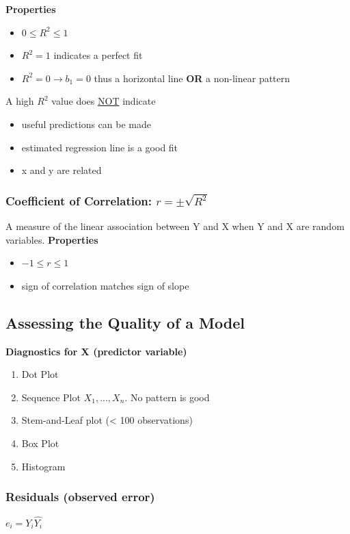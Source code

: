 \documentclass[11pt]{article}
\begin{document}
\textbf{Properties}
\begin{itemize}
\item \(0 \leq R^2 \leq 1\)
\item \(R^2 = 1\) indicates a perfect fit
\item \(R^2 = 0 \to b_1 = 0\) thus a horizontal line \textbf{OR} a non-linear pattern
\end{itemize}

A high \(R^2\) value does \uline{NOT} indicate
\begin{itemize}
\item useful predictions can be made
\item estimated regression line is a good fit
\item x and y are related
\end{itemize}
\subsubsection{Coefficient of Correlation: \(r = \pm \sqrt{R^2}\)}
\label{sec:orgb201af1}
A measure of the linear association between Y and X when Y and X are random variables.
\textbf{Properties}
\begin{itemize}
\item \(-1 \leq r \leq 1\)
\item sign of correlation matches sign of slope
\end{itemize}

\subsection{Assessing the Quality of a Model}
\label{sec:org5f55cde}

\textbf{Diagnostics for X (predictor variable)}
\begin{enumerate}
\item Dot Plot
\item Sequence Plot
\(X_1, ..., X_n\). No pattern is good
\item Stem-and-Leaf plot (< 100 observations)
\item Box Plot
\item Histogram
\end{enumerate}

\subsubsection{Residuals (observed error)}
\label{sec:orgfd9e3d4}
\(e_i = Y_i \hat{Y_i}\)
\end{document}
